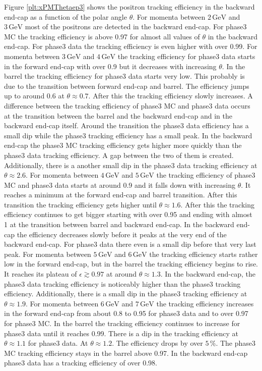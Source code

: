 \documentclass[a4paper,11pt,twosided,final,german,openbib,pdftex,listof=totoc,bibliography=totoc]{scrbook}
\begin{document}
Figure \ref{plt:xPMThetaep3} shows the positron tracking efficiency in the backward end-cap as a function of the polar angle $\theta$.
For momenta between $2\,\textrm{GeV}$ and $3\,\textrm{GeV}$ most of the positrons are detected in the backward end-cap. For phase3 MC the tracking efficiency is above 0.97 for almost all values of $\theta$ in the backward end-cap. For phase3 data the tracking efficiency is even higher with over 0.99.
For momenta between $3\,\textrm{GeV}$ and $4\,\textrm{GeV}$ the tracking efficiency for phase3 data starts in the forward end-cap with over 0.9 but it decreases with increasing $\theta$. In the barrel the tracking efficiency for phase3 data starts very low. This probably is due to the transition between forward end-cap and barrel. The efficiency jumps up to around 0.6 at $\theta \approx 0.7$. After this the tracking efficiency slowly increases. A difference between the tracking efficiency of phase3 MC and phase3 data occurs at the transition between the barrel and the backward end-cap and in the backward end-cap itself. Around the transition the phase3 data efficiency has a small dip while the phase3 tracking efficiency has a small peak. In the backward end-cap the phase3 MC tracking efficiency gets higher more quickly than the phase3 data tracking efficiency. A gap between the two of them is created. Additionally, there is a another small dip in the phase3 data tracking efficiency at $\theta \approx 2.6$. 
For momenta between $4\,\textrm{GeV}$ and $5\,\textrm{GeV}$ the tracking efficiency of phase3 MC and phase3 data starts at around 0.9 and it falls down with increasing $\theta$. It reaches a minimum at the forward end-cap and barrel transition. After this transition the tracking efficiency gets higher until $\theta \approx 1.6$. After this the tracking efficiency continues to get bigger starting with over 0.95 and ending with almost 1 at the transition between barrel and backward end-cap. In the backward end-cap the efficiency decreases slowly before it peaks at the very end of the backward end-cap. For phase3 data there even is a small dip before that very last peak.
For momenta between $5\,\textrm{GeV}$ and $6\,\textrm{GeV}$ the tracking efficiency starts rather low in the forward end-cap, but in the barrel the tracking efficiency begins to rise. It reaches its plateau of $\epsilon \gtrsim 0.97$ at around $\theta \approx 1.3$. In the backward end-cap, the phase3 data tracking efficiency is noticeably higher than the phase3 tracking efficiency. Additionally, there is a small dip in the phase3 tracking efficiency at $\theta \approx 1.9$. 
For momenta between $6\,\textrm{GeV}$ and $7\,\textrm{GeV}$ the tracking efficiency increases in the forward end-cap from  about 0.8 to 0.95 for phase3 data and to over 0.97 for phase3 MC. In the barrel the tracking efficiency continues to increase for phase3 data until it reaches 0.99. There is a dip in the tracking efficiency at $\theta \approx 1.1$ for phase3 data. At $\theta \approx 1.2$. The efficiency drops by over $5\,\%$. The phase3 MC tracking efficiency stays in the barrel above 0.97. In the backward end-cap phase3 data has a tracking efficiency of over 0.98.
\end{document}
